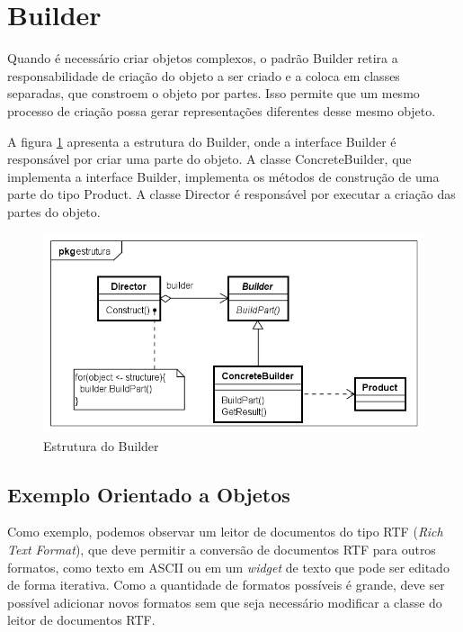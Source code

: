 \section{Builder}

Quando é necessário criar objetos  
complexos, o padrão Builder retira a 
responsabilidade de criação do objeto a 
ser criado e a coloca em classes separadas, 
que constroem o objeto por partes. 
Isso permite que um mesmo processo de criação 
possa gerar representações diferentes desse mesmo 
objeto.

A figura \ref{builder_struct} apresenta 
a estrutura do Builder, onde a interface 
Builder é responsável por criar uma parte 
do objeto. A classe ConcreteBuilder, que 
implementa a interface Builder, 
implementa os métodos de construção de 
uma parte do tipo Product. A classe Director 
é responsável por executar a criação das 
partes do objeto.

\begin{figure}[htb]
	\caption{\label{builder_struct}Estrutura do Builder}
	\begin{center}
	    \includegraphics[scale=0.5]{5_padroes-contexto-funcional/5.1_criacionais/5.1.3_builder/builder_estrutura.png}
	\end{center}
\end{figure}

\subsection*{Exemplo Orientado a Objetos}

Como exemplo, podemos observar um leitor de 
documentos do tipo RTF (\textit{Rich Text Format}), 
que deve permitir a conversão de documentos RTF 
para outros formatos, como texto em ASCII ou em um 
\textit{widget} de texto que pode ser editado de 
forma iterativa. Como a quantidade de formatos 
possíveis é grande, deve ser possível adicionar 
novos formatos sem que seja necessário modificar 
a classe do leitor de documentos RTF. 

